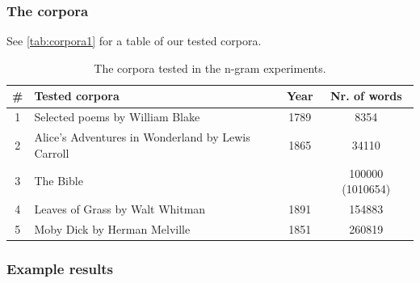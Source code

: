 \documentclass[a4paper,12pt]{article}
\begin{document}
\subsubsection{The corpora}
See \ref{tab:corpora1} for a table of our tested corpora.
\begin{table}
\begin{center}
\begin{tabular}{|c|l|c|c|}
\hline
\# & Tested corpora & Year & Nr. of words\\ \hline
1 & Selected poems by William Blake & 1789 & 8354 \\ \hline
2 & Alice's Adventures in Wonderland by Lewis Carroll & 1865 & 34110 \\ \hline
3 & The Bible & & 100000 (1010654) \\ \hline
4 & Leaves of Grass by Walt Whitman & 1891 & 154883\\ \hline
5 & Moby Dick by Herman Melville & 1851 & 260819\\ \hline


\end{tabular}
\caption{The corpora tested in the n-gram experiments.}
\label{tab:corplist}
\end{center}
\end{table}

\subsubsection{Example results}
\end{document}
